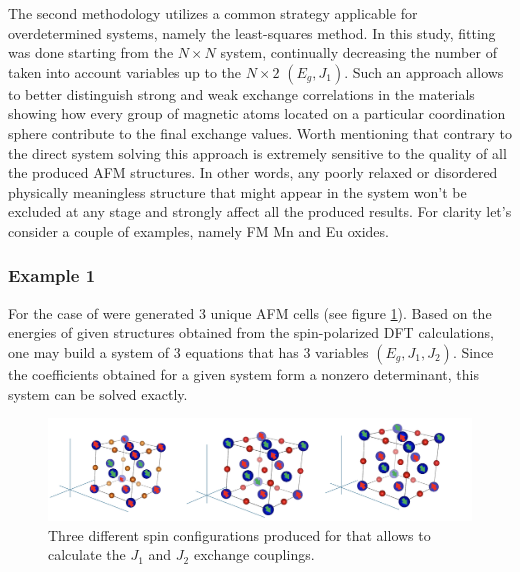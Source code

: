 The second methodology utilizes a common strategy applicable for overdetermined systems, namely the least-squares method. In this study, fitting was done starting from the $N \times N$ system, continually decreasing the number of taken into account variables up to the $N \times 2$ $(E_g, J_1)$. Such an approach allows to better distinguish strong and weak exchange correlations in the materials showing how every group of magnetic atoms located on a particular coordination sphere contribute to the final exchange values. Worth mentioning that contrary to the direct system solving this approach is extremely sensitive to the quality of all the produced AFM structures. In other words,  any poorly relaxed or disordered physically meaningless structure that might appear in the system won't be excluded at any stage and strongly affect all the produced results.
For clarity let's consider a couple of examples, namely FM Mn and Eu oxides.

\subsubsection{Example 1}

For the case of  were generated 3 unique AFM cells (see figure \ref{fig:example_1}). Based on the energies of given structures obtained from the spin-polarized DFT calculations, one may build a system of 3 equations that has 3 variables $(E_g, J_1, J_2)$. Since the coefficients obtained for a given system form a nonzero determinant, this system can be solved exactly.

\begin{figure}[H]
\centering
\captionsetup{justification=centering,margin=2cm}
\includegraphics[width=160mm]{fig/dft_fig/example_1.png}
\caption[Three different spin configurations produced for .]{Three different spin configurations produced for  that allows to calculate the $J_1$ and $J_2$ exchange couplings.}
\label{fig:example_1}
\end{figure}

